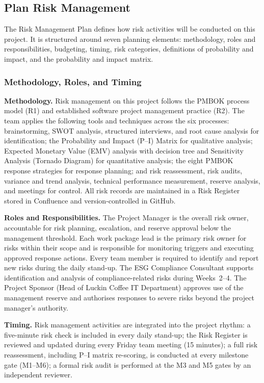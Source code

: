 \documentclass[12pt,a4paper]{article}
\begin{document}
\subsection{Plan Risk Management}

The Risk Management Plan defines how risk activities will be conducted on this project. It is structured around seven planning elements: methodology, roles and responsibilities, budgeting, timing, risk categories, definitions of probability and impact, and the probability and impact matrix.

\subsubsection{Methodology, Roles, and Timing}

\textbf{Methodology.} Risk management on this project follows the PMBOK process model (R1) and established software project management practice (R2). The team applies the following tools and techniques across the six processes: brainstorming, SWOT analysis, structured interviews, and root cause analysis for identification; the Probability and Impact (P--I) Matrix for qualitative analysis; Expected Monetary Value (EMV) analysis with decision tree and Sensitivity Analysis (Tornado Diagram) for quantitative analysis; the eight PMBOK response strategies for response planning; and risk reassessment, risk audits, variance and trend analysis, technical performance measurement, reserve analysis, and meetings for control. All risk records are maintained in a Risk Register stored in Confluence and version-controlled in GitHub.

\textbf{Roles and Responsibilities.} The Project Manager is the overall risk owner, accountable for risk planning, escalation, and reserve approval below the management threshold. Each work package lead is the primary risk owner for risks within their scope and is responsible for monitoring triggers and executing approved response actions. Every team member is required to identify and report new risks during the daily stand-up. The ESG Compliance Consultant supports identification and analysis of compliance-related risks during Weeks~2--4. The Project Sponsor (Head of Luckin Coffee IT Department) approves use of the management reserve and authorises responses to severe risks beyond the project manager's authority.

\textbf{Timing.} Risk management activities are integrated into the project rhythm: a five-minute risk check is included in every daily stand-up; the Risk Register is reviewed and updated during every Friday team meeting (15 minutes); a full risk reassessment, including P--I matrix re-scoring, is conducted at every milestone gate (M1--M6); a formal risk audit is performed at the M3 and M5 gates by an independent reviewer.
\end{document}
